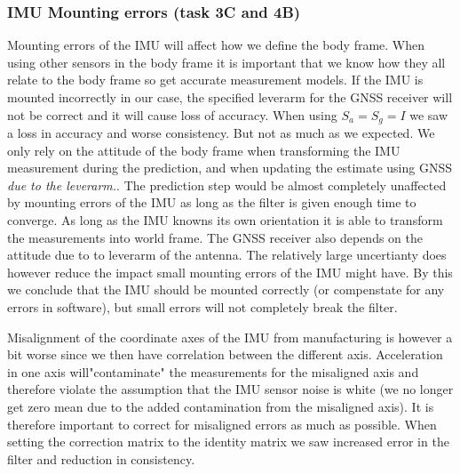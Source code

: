 \subsubsection{IMU Mounting errors (task 3C and 4B)}
Mounting errors of the IMU will affect how we define the body frame. When using other sensors in the body frame it is important that we know how they all relate to the body frame so get accurate measurement models. If the IMU is mounted incorrectly in our case, the specified leverarm for the GNSS receiver will not be correct and it will cause loss of accuracy. When using $S_a = S_g = I$ we saw a loss in accuracy and worse consistency. But not as much as we expected. We only rely on the attitude of the body frame when transforming the IMU measurement during the prediction, and when updating the estimate using GNSS \textit{due to the leverarm.}. The prediction step would be almost completely unaffected by mounting errors of the IMU as long as the filter is given enough time to converge. As long as the IMU knowns its own orientation it is able to transform the measurements into world frame. The GNSS receiver also depends on the attitude due to to leverarm of the antenna. The relatively large uncertianty does however reduce the impact small mounting errors of the IMU might have. By this we conclude that the IMU should be mounted correctly (or compenstate for any errors in software), but small errors will not completely break the filter. 

Misalignment of the coordinate axes of the IMU from manufacturing is however a bit worse since we then have correlation between the different axis. Acceleration in one axis will"contaminate" the measurements for the misaligned axis and therefore violate the assumption that the IMU sensor noise is white (we no longer get zero mean due to the added contamination from the misaligned axis). It is therefore important to correct for misaligned errors as much as possible. When setting the correction matrix to the identity matrix we saw increased error in the filter and reduction in consistency.  




